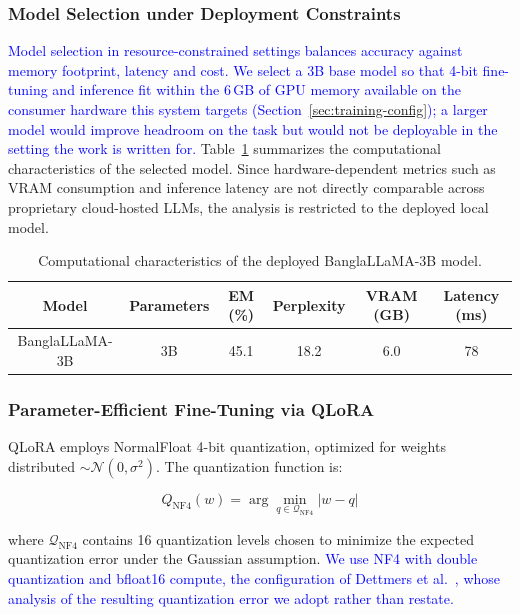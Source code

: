 \documentclass{article}
\newcommand{\revised}[1]{\textcolor{blue}{#1}}
\newcommand{\revised}[1]{#1}
\begin{document}
\subsubsection{Model Selection under Deployment Constraints}

\revised{Model selection in resource-constrained settings balances accuracy against
memory footprint, latency and cost. We select a 3B base model so that 4-bit fine-tuning
and inference fit within the 6\,GB of GPU memory available on the consumer hardware
this system targets (Section~\ref{sec:training-config}); a larger model would improve
headroom on the task but would not be deployable in the setting the work is written
for.} Table~\ref{tab:pareto_analysis} summarizes the computational characteristics of
the selected model. Since hardware-dependent metrics such as VRAM consumption and
inference latency are not directly comparable across proprietary cloud-hosted LLMs, the
analysis is restricted to the deployed local model.

\begin{table}[!h]
\centering
\caption{Computational characteristics of the deployed BanglaLLaMA-3B model.}
\label{tab:pareto_analysis}
\begin{tabular}{cccccc}
\hline
\textbf{Model} &
\textbf{Parameters} &
\textbf{EM (\%)} &
\textbf{Perplexity} &
\textbf{VRAM (GB)} &
\textbf{Latency (ms)}\\
\hline
BanglaLLaMA-3B & 3B & 45.1 & 18.2 & 6.0 & 78\\
\hline
\end{tabular}
\end{table}

\subsubsection{Parameter-Efficient Fine-Tuning via QLoRA}

QLoRA employs NormalFloat 4-bit quantization, optimized for weights distributed $\sim
\mathcal{N}(0, \sigma^2)$. The quantization function is:

\begin{equation}
Q_{\text{NF4}}(w) = \arg\min_{q \in \mathcal{Q}_{\text{NF4}}} |w - q|
\end{equation}

where $\mathcal{Q}_{\text{NF4}}$ contains 16 quantization levels chosen to minimize the
expected quantization error under the Gaussian assumption. \revised{We use NF4 with
double quantization and bfloat16 compute, the configuration of Dettmers et
al.~\cite{Dettmers2023}, whose analysis of the resulting quantization error we adopt
rather than restate.}
\end{document}
